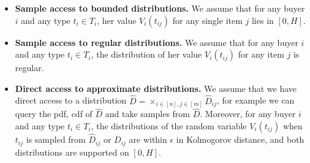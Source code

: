{\begin{itemize}
	\item \textbf{Sample access to bounded distributions.} We assume that for any buyer $i$ and any type $t_i\in T_i$, her value $V_i(t_{ij})$ for any single item $j$ lies in $[0,H]$. 
	\item \textbf{Sample access to regular distributions.} We assume that for any buyer $i$ and any type $t_i\in T_i$, the distribution of her value $V_i(t_{ij})$ for any item $j$ is regular.
	\item \textbf{Direct access to approximate distributions.} We assume that we have direct access to a distribution $\hat{D}=\times_{i\in[n], j\in[m]} \hat{D}_{ij}$, for example we can query the pdf, cdf of $\hat{D}$ and take samples from $\hat{D}$. Moreover, for any buyer $i$ and any type $t_i\in T_i$, the distributions of the random variable $V_i(t_{ij})$ when $t_{ij}$ is sampled from $\hat{D}_{ij}$ or  $D_{ij}$ are within $\epsilon$ in Kolmogorov distance, and both distributions  are supported on $[0,H]$. %
\end{itemize}}


